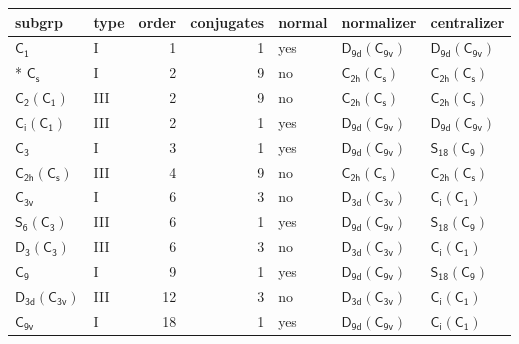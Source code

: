 \documentclass[10pt,a4paper]{article}
\numberwithin{equation}{section}
\newcommand{\grp}[1]{\mathsf{#1}}
\begin{document}
{\small\begin{longtable}{@{}llrrlll@{}}\toprule
subgrp & type & order & conjugates & normal & normalizer & centralizer\\\midrule\endhead
\bottomrule\endfoot\endlastfoot
\href{../../../rotation/data/pdf/C1.pdf}{$\grp{C_{1}}$} & I & 1 & 1 & yes & \href{D9d-C9v.pdf}{$\grp{D_{9d}}(\grp{C_{9v}})$} & \href{D9d-C9v.pdf}{$\grp{D_{9d}}(\grp{C_{9v}})$}\\*
\href{../../../rotation/data/pdf/C1v.pdf}{$\grp{C_{s}}$} & I & 2 & 9 & no & \href{C2h-C1v.pdf}{$\grp{C_{2h}}(\grp{C_{s}})$} & \href{C2h-C1v.pdf}{$\grp{C_{2h}}(\grp{C_{s}})$}\\
\href{C2-C1.pdf}{$\grp{C_{2}}(\grp{C_{1}})$} & III & 2 & 9 & no & \href{C2h-C1v.pdf}{$\grp{C_{2h}}(\grp{C_{s}})$} & \href{C2h-C1v.pdf}{$\grp{C_{2h}}(\grp{C_{s}})$}\\
\href{S2-C1.pdf}{$\grp{C_{i}}(\grp{C_{1}})$} & III & 2 & 1 & yes & \href{D9d-C9v.pdf}{$\grp{D_{9d}}(\grp{C_{9v}})$} & \href{D9d-C9v.pdf}{$\grp{D_{9d}}(\grp{C_{9v}})$}\\
\href{../../../rotation/data/pdf/C3.pdf}{$\grp{C_{3}}$} & I & 3 & 1 & yes & \href{D9d-C9v.pdf}{$\grp{D_{9d}}(\grp{C_{9v}})$} & \href{S18-C9.pdf}{$\grp{S_{18}}(\grp{C_{9}})$}\\
\href{C2h-C1v.pdf}{$\grp{C_{2h}}(\grp{C_{s}})$} & III & 4 & 9 & no & \href{C2h-C1v.pdf}{$\grp{C_{2h}}(\grp{C_{s}})$} & \href{C2h-C1v.pdf}{$\grp{C_{2h}}(\grp{C_{s}})$}\\
\href{../../../rotation/data/pdf/C3v.pdf}{$\grp{C_{3v}}$} & I & 6 & 3 & no & \href{D3d-C3v.pdf}{$\grp{D_{3d}}(\grp{C_{3v}})$} & \href{S2-C1.pdf}{$\grp{C_{i}}(\grp{C_{1}})$}\\
\href{S6-C3.pdf}{$\grp{S_{6}}(\grp{C_{3}})$} & III & 6 & 1 & yes & \href{D9d-C9v.pdf}{$\grp{D_{9d}}(\grp{C_{9v}})$} & \href{S18-C9.pdf}{$\grp{S_{18}}(\grp{C_{9}})$}\\
\href{D3-C3.pdf}{$\grp{D_{3}}(\grp{C_{3}})$} & III & 6 & 3 & no & \href{D3d-C3v.pdf}{$\grp{D_{3d}}(\grp{C_{3v}})$} & \href{S2-C1.pdf}{$\grp{C_{i}}(\grp{C_{1}})$}\\
\href{../../../rotation/data/pdf/C9.pdf}{$\grp{C_{9}}$} & I & 9 & 1 & yes & \href{D9d-C9v.pdf}{$\grp{D_{9d}}(\grp{C_{9v}})$} & \href{S18-C9.pdf}{$\grp{S_{18}}(\grp{C_{9}})$}\\
\href{D3d-C3v.pdf}{$\grp{D_{3d}}(\grp{C_{3v}})$} & III & 12 & 3 & no & \href{D3d-C3v.pdf}{$\grp{D_{3d}}(\grp{C_{3v}})$} & \href{S2-C1.pdf}{$\grp{C_{i}}(\grp{C_{1}})$}\\
\href{../../../rotation/data/pdf/C9v.pdf}{$\grp{C_{9v}}$} & I & 18 & 1 & yes & \href{D9d-C9v.pdf}{$\grp{D_{9d}}(\grp{C_{9v}})$} & \href{S2-C1.pdf}{$\grp{C_{i}}(\grp{C_{1}})$}\\

\end{longtable}}
\end{document}
